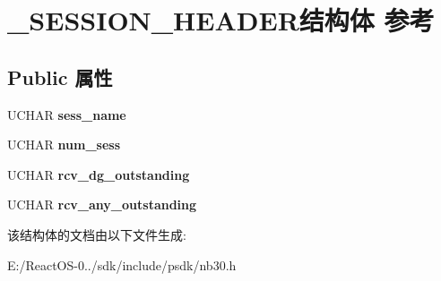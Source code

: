 \hypertarget{struct___s_e_s_s_i_o_n___h_e_a_d_e_r}{}\section{\+\_\+\+S\+E\+S\+S\+I\+O\+N\+\_\+\+H\+E\+A\+D\+E\+R结构体 参考}
\label{struct___s_e_s_s_i_o_n___h_e_a_d_e_r}
\subsection*{Public 属性}
\begin{DoxyCompactItemize}
\item 
\mbox{\label{struct___s_e_s_s_i_o_n___h_e_a_d_e_r_a59df5c98fbd727463ae4a2acae635d5e}} 
U\+C\+H\+AR {\bfseries sess\+\_\+name}
\item 
\mbox{\label{struct___s_e_s_s_i_o_n___h_e_a_d_e_r_aa9417e2ec28afd6cb4280b9d3905eb8c}} 
U\+C\+H\+AR {\bfseries num\+\_\+sess}
\item 
\mbox{\label{struct___s_e_s_s_i_o_n___h_e_a_d_e_r_a00bc922389c85281b5617fc5eac9a7ca}} 
U\+C\+H\+AR {\bfseries rcv\+\_\+dg\+\_\+outstanding}
\item 
\mbox{\label{struct___s_e_s_s_i_o_n___h_e_a_d_e_r_ae87b3e629116a25aab4ae4aaf71f08ea}} 
U\+C\+H\+AR {\bfseries rcv\+\_\+any\+\_\+outstanding}
\end{DoxyCompactItemize}


该结构体的文档由以下文件生成\+:\begin{DoxyCompactItemize}
\item 
E\+:/\+React\+O\+S-\/0../sdk/include/psdk/nb30.\+h\end{DoxyCompactItemize}
